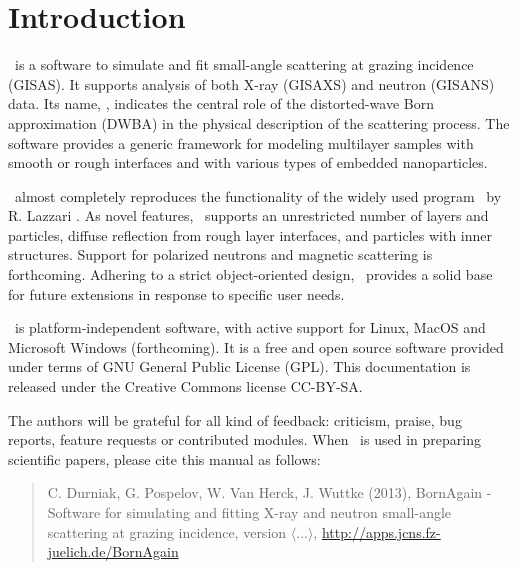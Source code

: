 \newpage
\chapter*{Introduction}


\BornAgain\ is a  software to simulate and fit small-angle
scattering at grazing incidence (GISAS). 
It supports analysis of both  X-ray (GISAXS) and neutron (GISANS) data.
Its name, \BornAgain, indicates the central role of the distorted-wave Born
approximation (DWBA) in the physical description of the
scattering process. The software provides a generic framework for modeling multilayer samples with smooth or
rough interfaces and with various types of embedded nano\-particles.

\BornAgain\ almost completely reproduces the functionality
of the widely used program \IsGISAXS\
by R. Lazzari \cite{Laz02}.
As novel features, \BornAgain\
supports an unrestricted number of layers and particles, 
diffuse reflection from rough layer interfaces,
and particles with inner structures.
Support for polarized neutrons and magnetic scattering is forthcoming.
Adhering to a strict object-oriented design,
\BornAgain\ provides a solid base for future extensions
in response to specific user needs.

\BornAgain\ is platform-independent software,
with active support for Linux, MacOS and 
Microsoft Windows (forthcoming). 
It is a free and open source software provided under terms
of GNU General Public License (GPL).
This documentation is released under the Creative Commons license CC-BY-SA.

The authors will be grateful for all kind of
feedback: criticism, praise, bug reports, feature requests
or contributed modules.
When \BornAgain\ is used in preparing scientific papers,
please cite this manual as follows: 
\begin{quote}
C. Durniak, G. Pospelov, W. Van Herck, J. Wuttke (2013),\newline
BornAgain - Software for simulating and fitting
X-ray and neutron small-angle scattering at grazing incidence,
version $\langle\ldots\rangle$,\newline
\url{http://apps.jcns.fz-juelich.de/BornAgain}
\end{quote}


